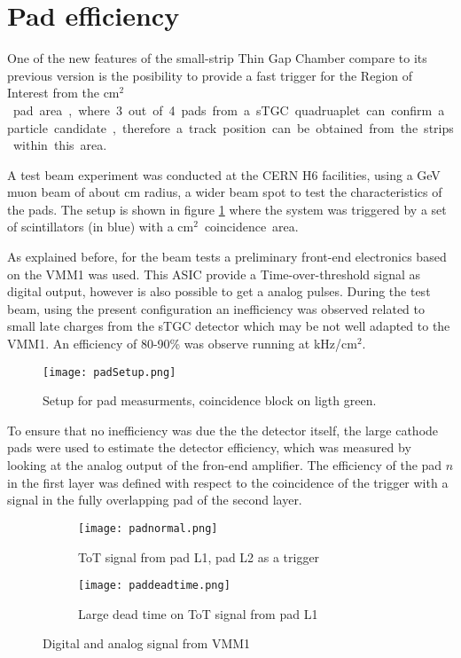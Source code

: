 \section{Pad efficiency}
One of the new features of the small-strip Thin Gap Chamber compare to its previous version is the posibility to provide
a fast trigger for the Region of Interest from the \unit[8x50]{cm$^2$} pad area, where 3 out of 4 pads from a sTGC
quadruaplet can confirm a particle candidate, therefore a track position can be obtained from the strips within this
area.\par
A test beam experiment was conducted at the CERN H6 facilities, using a \unit[130]{GeV} muon beam of about
\unit[4]{cm}
radius, a wider beam spot to test the characteristics of the pads. The setup is shown in figure \ref{padsetup} where the system was
triggered by a set of scintillators (in blue) with a \unit[12x12]{cm$^2$} coincidence area.\par
As explained before, for the beam tests a preliminary front-end electronics based on the VMM1 was used. This ASIC
provide a Time-over-threshold signal as digital output, however is also possible to get a analog pulses.
During the test beam, using the present configuration an inefficiency was observed related to small late charges from
the sTGC detector which may be not well adapted to the VMM1. An efficiency of 80-90\% was observe running at
\unit[100]{kHz/cm$^2$}.\par


\begin{figure}[ht]
\centering
\texttt{[image: padSetup.png]}
\caption{Setup for pad measurments, coincidence block on ligth green.}\label{padsetup}
\end{figure}


To ensure that no inefficiency was due the the detector itself, the large cathode pads were used to estimate the detector
efficiency, which was measured by looking at the analog output of the fron-end amplifier. The efficiency of the pad $n$
in the first layer was defined with respect to the coincidence of the trigger with a signal in the fully overlapping pad
of the second layer. \par



\begin{figure}[ht]
\centering
\begin{subfigure}[b]{0.45\textwidth}
\centering
\texttt{[image: padnormal.png]}
\caption{ToT signal from pad L1, pad L2 as a trigger}\label{scope1}
\end{subfigure}
\begin{subfigure}[b]{0.45\textwidth}
\centering
\texttt{[image: paddeadtime.png]}
\caption{Large dead time on ToT signal from pad L1}\label{scope2}
\end{subfigure}
\caption{Digital and analog signal from VMM1}\label{scope}
\end{figure}

